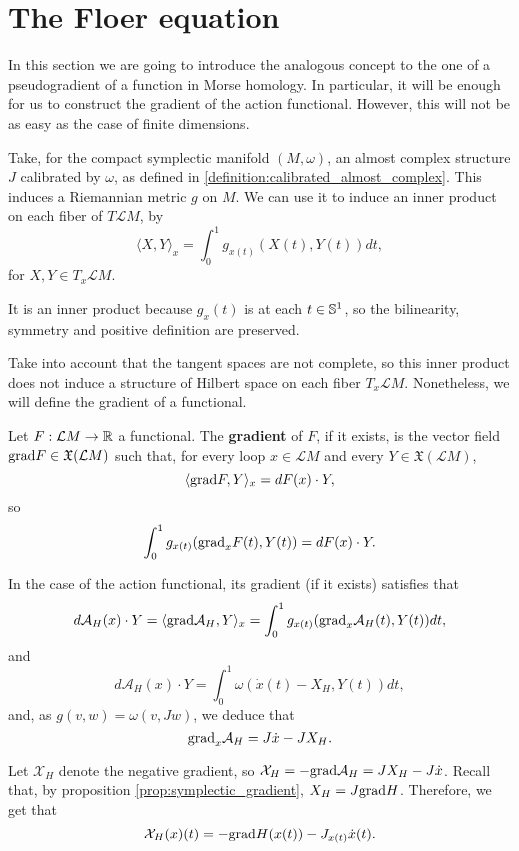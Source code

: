 \section{The Floer equation}

In this section we are going to introduce the analogous concept to the one of a pseudogradient of a function in Morse homology. In particular, it will be enough for us to construct the gradient of the action functional. However, this will not be as easy as the case of finite dimensions.

Take, for the compact symplectic manifold $(M,\omega)$, an almost complex structure $J$ calibrated by $\omega$, as defined in \ref{definition:calibrated_almost_complex}. This induces a Riemannian metric $g$ on $M$. We can use it to induce an inner product on each fiber of $T\mathcal{L}M$, by
\[\langle X, Y \rangle_x = \int_0^1 g_{x(t)} (X(t), Y(t)) d t,\]
for $X,Y \in T_x\mathcal{L}M$.

It is an inner product because $g_x(t)$ is at each $t \in \mathbb{S}^1$, so the bilinearity, symmetry and positive definition are preserved.

Take into account that the tangent spaces are not complete, so this inner product does not induce a structure of Hilbert space on each fiber $T_x\mathcal{L}M$. Nonetheless, we will define the gradient of a functional.

\begin{deff}
Let $F : \mathcal{L}M \rightarrow \mathbb{R}$ a functional. The {\bf gradient} of $F$, if it exists, is the vector field $\mathrm{grad} F \in \mathfrak{X}(\mathcal{L}M)$ such that, for every loop $x \in \mathcal{L}M$ and every $Y \in \mathfrak{X}(\mathcal{L}M)$,
\[\langle \mathrm{grad} F, Y \rangle_x = d F(x) \cdot Y ,\]
so
\[\int_0^1 g_{x(t)}(\mathrm{grad}_xF(t),Y(t)) = d F(x) \cdot Y .\]
\end{deff}

In the case of the action functional, its gradient (if it exists) satisfies that
\[d \mathcal{A}_H(x) \cdot Y = \langle \mathrm{grad}\mathcal{A}_H, Y \rangle_x = \int_0^1 g_{x(t)}(\mathrm{grad}_x\mathcal{A}_H(t),Y(t)) d t ,\]
and
\[d \mathcal{A}_H(x) \cdot Y = \int_0^1 \omega(\dot{x}(t)-X_H,Y(t)) d t ,\]
and, as $g(v,w) = \omega(v,Jw)$, we deduce that
\[\mathrm{grad}_x\mathcal{A}_H = J\dot{x} - J X_H .\]

Let $\mathcal{X}_H$ denote the negative gradient, so $\mathcal{X}_H = - \mathrm{grad}\mathcal{A}_H = J X_H - J \dot{x}$. Recall that, by proposition \ref{prop:symplectic_gradient}, $X_H = J \mathrm{grad} H$. Therefore, we get that
\[\mathcal{X}_H(x)(t) = - \mathrm{grad} H(x(t)) - J_{x(t)} \dot{x}(t) .\]

